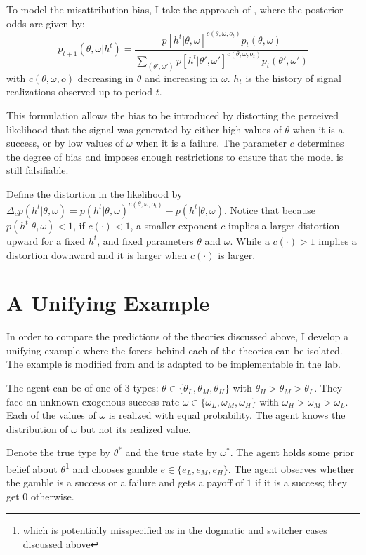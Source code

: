 \documentclass[
  12pt,
]{article}
\begin{document}
To model the misattribution bias, I take the approach of
\citet{benjamin2019}, where the posterior odds are given by: \[
p_{t+1}(\theta, \omega| h^t) = \frac{p[h^t|\theta, \omega]^{c(\theta, \omega, o_t)}p_t(\theta, \omega)}{\sum_{(\theta', \omega')}p[h^t|\theta', \omega']^{c(\theta, \omega, o_t)}p_t(\theta', \omega')}
\] with \(c(\theta, \omega, o)\) decreasing in \(\theta\) and increasing
in \(\omega\). \(h_t\) is the history of signal realizations observed up
to period \(t\).

This formulation allows the bias to be introduced by distorting the
perceived likelihood that the signal was generated by either high values
of \(\theta\) when it is a success, or by low values of \(\omega\) when
it is a failure. The parameter \(c\) determines the degree of bias and
imposes enough restrictions to ensure that the model is still
falsifiable.

Define the distortion in the likelihood by
\(\Delta_c p(h^t|\theta, \omega) = p(h^t|\theta, \omega)^{c(\theta, \omega, o_t)} - p(h^t|\theta, \omega)\).
Notice that because \(p(h^t|\theta, \omega)<1\), if \(c(\cdot)<1\), a
smaller exponent \(c\) implies a larger distortion upward for a fixed
\(h^t\), and fixed parameters \(\theta\) and \(\omega\). While a
\(c(\cdot)>1\) implies a distortion downward and it is larger when
\(c(\cdot)\) is larger.

\hypertarget{a-unifying-example}{%
\section{A Unifying Example}\label{a-unifying-example}}

In order to compare the predictions of the theories discussed above, I
develop a unifying example where the forces behind each of the theories
can be isolated. The example is modified from \citet{Heidhues2018} and
is adapted to be implementable in the lab.

The agent can be of one of 3 types:
\(\theta \in \{\theta_L, \theta_M, \theta_H\}\) with
\(\theta_H > \theta_M > \theta_L\). They face an unknown exogenous
success rate \(\omega \in \{\omega_L, \omega_M, \omega_H\}\) with
\(\omega_H>\omega_M>\omega_L\). Each of the values of \(\omega\) is
realized with equal probability. The agent knows the distribution of
\(\omega\) but not its realized value.

Denote the true type by \(\theta^*\) and the true state by \(\omega^*\).
The agent holds some prior belief about
\(\theta\)\footnote{which is potentially misspecified as in the dogmatic and switcher cases discussed above}
and chooses gamble \(e \in \{e_L, e_M, e_H\}\). The agent observes
whether the gamble is a success or a failure and gets a payoff of \(1\)
if it is a success; they get \(0\) otherwise.
\end{document}
